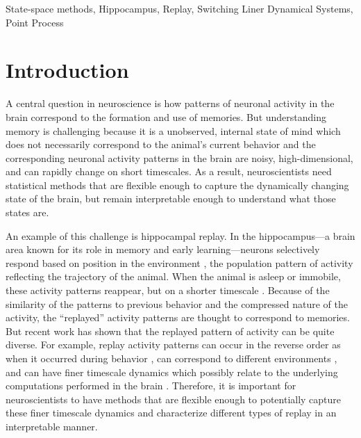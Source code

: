 \documentclass[conference]{IEEEtran}
\begin{document}
\begin{IEEEkeywords}
State-space methods, Hippocampus, Replay, Switching Liner Dynamical Systems, Point Process
\end{IEEEkeywords}

\section{Introduction}
A central question in neuroscience is how patterns of neuronal activity in the brain correspond to the formation and use of memories. But understanding memory is challenging because it is a unobserved, internal state of mind which does not necessarily correspond to the animal’s current behavior and the corresponding neuronal activity patterns in the brain are noisy, high-dimensional, and can rapidly change on short timescales. As a result, neuroscientists need statistical methods that are flexible enough to capture the dynamically changing state of the brain, but remain interpretable enough to understand what those states are.

An example of this challenge is hippocampal replay. In the hippocampus---a brain area known for its role in memory and early learning---neurons selectively respond based on position in the environment \cite{OKeefehippocampusspatialmap1971}, the population pattern of activity reflecting the trajectory of the animal. When the animal is asleep or immobile, these activity patterns reappear, but on a shorter timescale \cite{WilsonReactivationhippocampalensemble1994, NadasdyReplayTimeCompression1999}. Because of the similarity of the patterns to previous behavior and the compressed nature of the activity, the “replayed” activity patterns are thought to correspond to memories. But recent work has shown that the replayed pattern of activity can be quite diverse. For example, replay activity patterns can occur in the reverse order as when it occurred during behavior \cite{FosterReversereplaybehavioural2006, DibaForwardreversehippocampal2007}, can correspond to different environments \cite{KarlssonAwakereplayremote2009}, and can have finer timescale dynamics which possibly relate to the underlying computations performed in the brain \cite{PfeifferAutoassociativedynamicsgeneration2015}. Therefore, it is important for neuroscientists to have methods that are flexible enough to potentially capture these finer timescale dynamics and characterize different types of replay in an interpretable manner.
\end{document}

